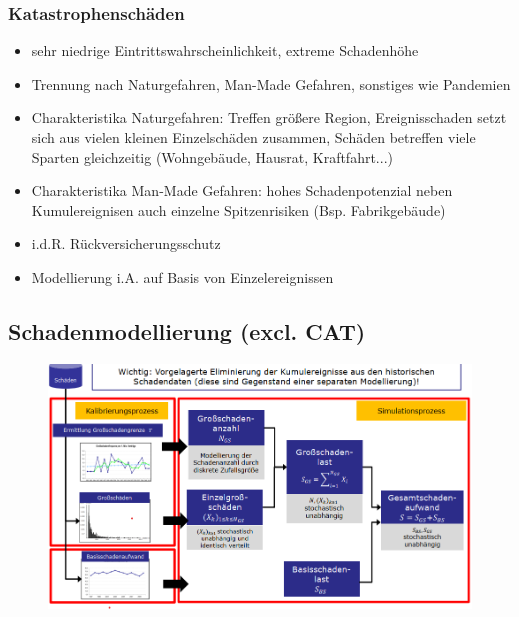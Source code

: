 \documentclass[12pt]{report}
\theoremstyle{dotless}
\theoremstyle{definition}
\begin{document}
\subsubsection{Katastrophenschäden}
\begin{itemize}
\item sehr niedrige Eintrittswahrscheinlichkeit, extreme Schadenhöhe
\item Trennung nach Naturgefahren, Man-Made Gefahren, sonstiges wie Pandemien
\item Charakteristika Naturgefahren: Treffen größere Region, Ereignisschaden setzt sich aus vielen kleinen Einzelschäden zusammen, Schäden betreffen viele Sparten gleichzeitig (Wohngebäude, Hausrat, Kraftfahrt...)
\item Charakteristika Man-Made Gefahren: hohes Schadenpotenzial neben Kumulereignisen auch einzelne Spitzenrisiken (Bsp. Fabrikgebäude)
\item i.d.R. Rückversicherungsschutz
\item Modellierung i.A. auf Basis von Einzelereignissen
\end{itemize}

\subsection{Schadenmodellierung (excl. CAT)}

\begin{figure}[ht]
	\centering
	\includegraphics[width= \textwidth]{Bilder/Folie27.png}
\end{figure}
\end{document}
